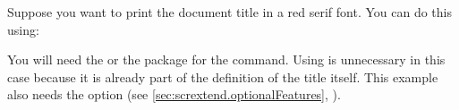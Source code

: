 \else
    \begin{Example}
      Suppose you want to print the document title in a red serif font.
      You can do this using:
\begin{lstcode}
\end{lstcode}
      You will need the  or the  package for
      the  command. Using  is
      unnecessary in this case because it is already part of the definition of
      the title itself. This example also needs the
       option (see
      \autoref{sec:scrextend.optionalFeatures}, 
      ).
    \end{Example}
  \else
